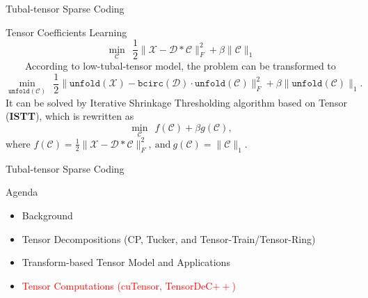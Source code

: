 \documentclass[t, 10pt, handout, aspectratio=169]{beamer}
\begin{document}
\begin{frame}{Tubal-tensor Sparse Coding}
\begin{block}{Tensor Coefficients Learning}
$$
\min_{\mathcal{C}}~~\frac{1}{2}\|\mathcal{X}-\mathcal{D}*\mathcal{C}\|_F^2+\beta\|\mathcal{C}\|_1
$$
~~~~According to low-tubal-tensor model, the problem can be transformed to
$$
\min_{\texttt{unfold}(\mathcal{C})}~~\frac{1}{2}\|\texttt{unfold}(\mathcal{X})-\texttt{bcirc}(\mathcal{D})\cdot\texttt{unfold}(\mathcal{C})\|_F^2+\beta\|\texttt{unfold}(\mathcal{C})\|_1.
$$
It can be solved by Iterative Shrinkage Thresholding algorithm based on Tensor (\textbf{ISTT}), which is rewritten as
$$
\min_{\mathcal{C}}~~f(\mathcal{C})+\beta g(\mathcal{C}),
$$
where $f(\mathcal{C}) = \frac{1}{2}\|\mathcal{X}-\mathcal{D}*\mathcal{C}\|_F^2,~\text{and}~g(\mathcal{C}) = \|\mathcal{C}\|_1$.
\end{block}
\end{frame}

\begin{frame}{Tubal-tensor Sparse Coding}
\end{frame}

\begin{frame}{Agenda}
\begin{itemize}
    \large \item {Background}
    \large \item {Tensor Decompositions (CP, Tucker, and Tensor-Train/Tensor-Ring)}
    \large \item {Transform-based Tensor Model and Applications}
    \large \item \textcolor{red}{Tensor Computations (cuTensor, TensorDeC$++$)}
\end{itemize}
\end{frame}
\end{document}
